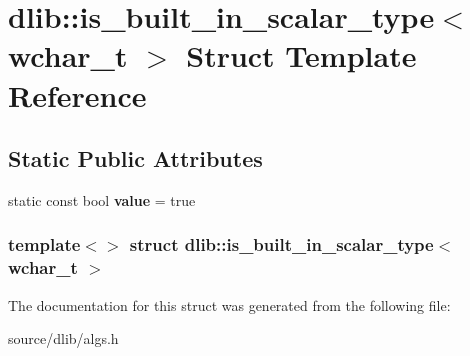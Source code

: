 \hypertarget{structdlib_1_1is__built__in__scalar__type_3_01wchar__t_01_4}{
\section{dlib::is\_\-built\_\-in\_\-scalar\_\-type$<$ wchar\_\-t $>$ Struct Template Reference}
\label{structdlib_1_1is__built__in__scalar__type_3_01wchar__t_01_4}
}
\subsection*{Static Public Attributes}
\begin{DoxyCompactItemize}
\item 
\hypertarget{structdlib_1_1is__built__in__scalar__type_3_01wchar__t_01_4_afd71d33e4d414298b06e20fd3fc1d6c2}{
static const bool {\bfseries value} = true}
\label{structdlib_1_1is__built__in__scalar__type_3_01wchar__t_01_4_afd71d33e4d414298b06e20fd3fc1d6c2}

\end{DoxyCompactItemize}
\subsubsection*{template$<$$>$ struct dlib::is\_\-built\_\-in\_\-scalar\_\-type$<$ wchar\_\-t $>$}



The documentation for this struct was generated from the following file:\begin{DoxyCompactItemize}
\item 
source/dlib/algs.h\end{DoxyCompactItemize}
